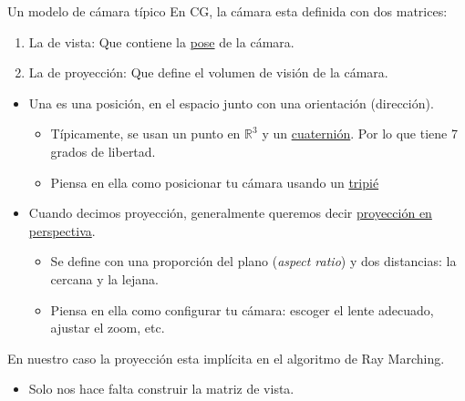 \begin{frame}{Un modelo de cámara típico}
En CG, la cámara esta definida con dos matrices:
\begin{enumerate}
  \item La de \alert{vista}: Que contiene la \href{https://en.wikipedia.org/wiki/Pose_(computer_vision)}{pose} de la cámara.
  \item La de \alert{proyección}: Que define el volumen de visión de la cámara.
\end{enumerate}
\begin{itemize}
   \item Una  es una posición, en el espacio junto con una orientación (dirección).
   \begin{itemize}
     \item Típicamente, se usan un punto en $\mathbb{R}^3$ y un \href{https://en.wikipedia.org/wiki/Quaternion}{cuaternión}. Por lo que tiene 7 grados de libertad.
     \item Piensa en ella como posicionar tu cámara usando un \href{https://en.wikipedia.org/wiki/Tripod_(photography)}{tripié}
   \end{itemize}
   \item Cuando decimos proyección, generalmente queremos decir \href{https://en.wikipedia.org/wiki/3D_projection\#Perspective_projection}{proyección en perspectiva}.
   \begin{itemize}
     \item Se define con una proporción del plano (\emph{aspect ratio}) y dos distancias: la cercana y la lejana.
     \item Piensa en ella como configurar tu cámara: escoger el lente adecuado, ajustar el zoom, etc.
   \end{itemize}
\end{itemize}
\begin{block}{}
 En nuestro caso la proyección esta implícita en el algoritmo de Ray Marching.
 \begin{itemize}
   \item Solo nos hace falta construir la matriz de vista.
 \end{itemize}
\end{block}
\end{frame}

